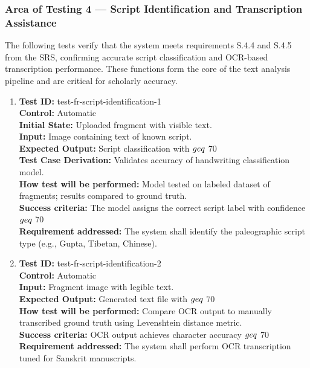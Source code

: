 \documentclass[12pt, titlepage]{article}
\begin{document}
\subsubsection{Area of Testing 4 — Script Identification and Transcription Assistance}

The following tests verify that the system meets requirements S.4.4 and S.4.5 from the SRS, confirming accurate script classification and OCR-based transcription performance. These functions form the core of the text analysis pipeline and are critical for scholarly accuracy.

\begin{enumerate}
\item
\textbf{Test ID:} test-fr-script-identification-1\\
\textbf{Control:} Automatic\\
\textbf{Initial State:} Uploaded fragment with visible text.\\
\textbf{Input:} Image containing text of known script.\\
\textbf{Expected Output:} Script classification with $\\geq$ 70\\%
\textbf{Test Case Derivation:} Validates accuracy of handwriting classification model.\\
\textbf{How test will be performed:} Model tested on labeled dataset of fragments; results compared to ground truth.\\
\textbf{Success criteria:} The model assigns the correct script label with confidence $\\geq$ 70\\%
\textbf{Requirement addressed:} The system shall identify the paleographic script type (e.g., Gupta, Tibetan, Chinese).\\

\item
\textbf{Test ID:} test-fr-script-identification-2\\
\textbf{Control:} Automatic\\
\textbf{Input:} Fragment image with legible text.\\
\textbf{Expected Output:} Generated text file with $\\geq$ 70\\%
\textbf{How test will be performed:} Compare OCR output to manually transcribed ground truth using Levenshtein distance metric.\\
\textbf{Success criteria:} OCR output achieves character accuracy $\\geq$ 70\\%
\textbf{Requirement addressed:} The system shall perform OCR transcription tuned for Sanskrit manuscripts.\\
\end{enumerate}
\end{document}
